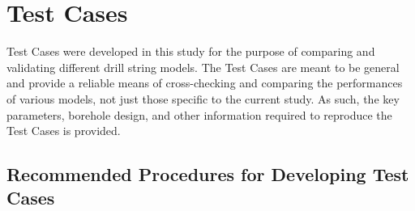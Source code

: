 \chapter{Test Cases}
\label{ch:testcases}
Test Cases were developed in this study for the purpose of comparing and validating different drill string models.  The Test Cases are meant to be general and provide a reliable means of cross-checking and comparing the performances of various models, not just those specific to the current study.  As such, the key parameters, borehole design, and other information required to reproduce the Test Cases is provided.

\section{Recommended Procedures for Developing Test Cases}
\notfinished{}

